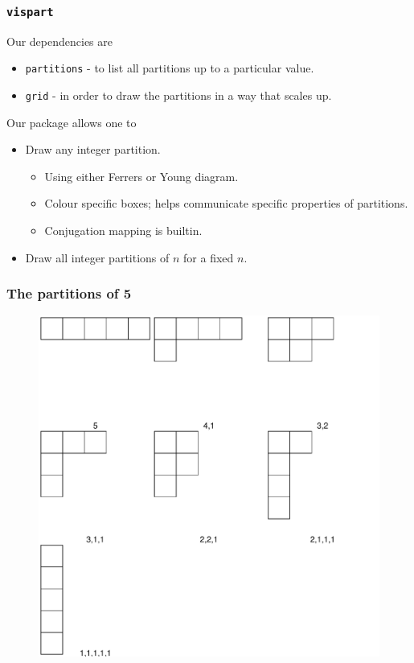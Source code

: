 \documentclass{beamer}
\begin{document}
\begin{frame}
\frametitle{\texttt{vispart} }	
Our dependencies are 
\begin{itemize}
\item \texttt{partitions} - to list all partitions up to a particular value.
\item \texttt{grid} - in order to draw the partitions in a way that scales up.
\end{itemize}	

Our package allows one to 
\begin{itemize}
\item Draw any integer partition.
\begin{itemize}
\item Using either Ferrers or Young diagram.
\item Colour specific boxes; helps communicate specific properties of partitions.
\item Conjugation mapping is builtin.
\end{itemize}
\item Draw all integer partitions of $n$ for a fixed $n$.
\end{itemize}


\end{frame}
\begin{frame}
\frametitle{The partitions of 5}
\begin{figure}
\includegraphics[scale = 0.4]{Partitions5}	
\end{figure}
\end{frame}
\end{document}
